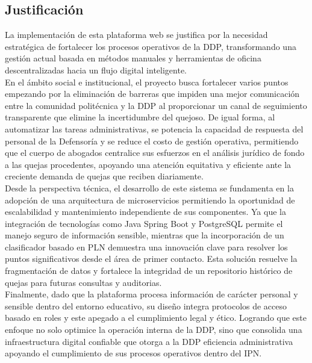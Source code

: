 \documentclass[12pt, letterpaper]{article}
\begin{document}
\subsection{Justificación}
La implementación de esta plataforma web se justifica por la necesidad estratégica de fortalecer los procesos operativos de la DDP, transformando una gestión actual basada en métodos manuales y herramientas de oficina descentralizadas hacia un flujo digital inteligente.
\\
En el ámbito social e institucional, el proyecto busca fortalecer varios puntos empezando por la eliminación de barreras que impiden una mejor comunicación entre la comunidad politécnica y la DDP al proporcionar un canal de seguimiento transparente que elimine la incertidumbre del quejoso. De igual forma, al automatizar las tareas administrativas, se potencia la capacidad de respuesta del personal de la Defensoría y se reduce el costo de gestión operativa, permitiendo que el cuerpo de abogados centralice sus esfuerzos en el análisis jurídico de fondo a las quejas procedentes, apoyando una atención equitativa y eficiente ante la creciente demanda de quejas que reciben diariamente.
\\
Desde la perspectiva técnica, el desarrollo de este sistema se fundamenta en la adopción de una arquitectura de microservicios permitiendo la oportunidad de escalabilidad y mantenimiento independiente de sus componentes. Ya que la integración de tecnologías como Java Spring Boot y PostgreSQL permite el manejo seguro de información sensible, mientras que la incorporación de un clasificador basado en PLN demuestra una innovación clave para resolver los puntos significativos desde el área de primer contacto. Esta solución resuelve la fragmentación de datos y fortalece la integridad de un repositorio histórico de quejas para futuras consultas y auditorias.
\\
Finalmente, dado que la plataforma procesa información de carácter personal y sensible dentro del entorno educativo, su diseño integra protocolos de acceso basado en roles y este apegado a el cumplimiento legal y ético. Logrando que este enfoque no solo optimice la operación interna de la DDP, sino que consolida una infraestructura digital confiable que otorga a la DDP eficiencia administrativa apoyando el cumplimiento de sus procesos operativos dentro del IPN.

\newpage
\end{document}
